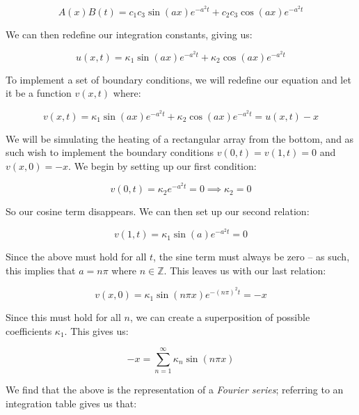 \documentclass[a4paper,10pt,english]{article}
\begin{document}
\begin{equation*}
A(x)B(t) = c_1 c_3 \sin( ax ) e^{-a^2 t} + c_2 c_3 \cos(ax) e^{-a^2 t}
\end{equation*}

We can then redefine our integration constants, giving us:

\begin{equation*}
u(x,t) = \kappa_1 \sin( ax ) e^{-a^2 t} + \kappa_2 \cos(ax) e^{-a^2 t}
\end{equation*}

To implement a set of boundary conditions, we will redefine our equation and let it be a function $v(x,t)$ where:

\begin{equation*}
v(x,t) = \kappa_1 \sin( ax ) e^{-a^2 t} + \kappa_2 \cos(ax) e^{-a^2 t} = u(x,t) - x
\end{equation*}

We will be simulating the heating of a rectangular array from the bottom, and as such wish to implement the boundary conditions $v(0,t) = v(1,t) = 0$ and $v(x,0) = -x$.  We begin by setting up our first condition:

\begin{equation*}
v(0,t) = \kappa_2 e^{-a^2 t} = 0 \implies \kappa_2 = 0
\end{equation*}

So our cosine term disappears.  We can then set up our second relation:

\begin{equation*}
v(1,t) = \kappa_1 \sin( a ) e^{-a^2 t} = 0
\end{equation*}

Since the above must hold for all $t$, the sine term must always be zero – as such, this implies that $a = n\pi$ where $n \in \mathbb{Z}$.  This leaves us with our last relation:

\begin{equation*}
v(x,0) = \kappa_1 \sin( n \pi x ) e^{-(n \pi)^2 t} = -x
\end{equation*}

Since this must hold for all $n$, we can create a superposition of possible coefficients $\kappa_1$.  This gives us:

\begin{equation*}
-x = \sum_{n=1}^{\infty} \kappa_n \sin(n \pi x)
\end{equation*}

We find that the above is the representation of a \textit{Fourier series}; referring to an integration table \cite{rottmann} gives us that:
\end{document}
